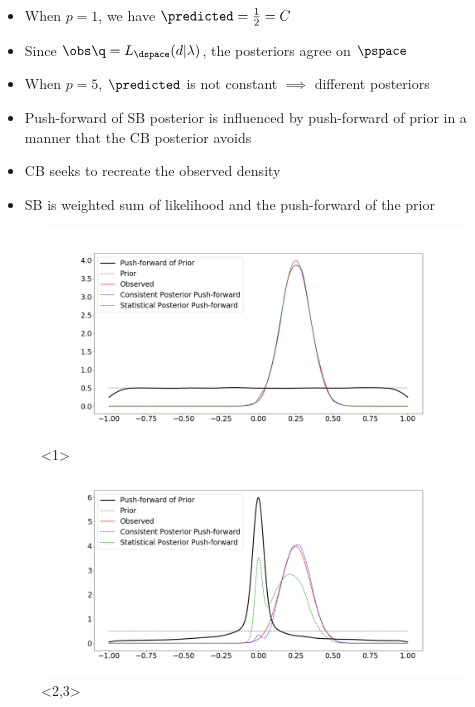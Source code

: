 
\begin{frame}[t]

\begin{itemize}
	\item <1,3> When $p=1$, we have $\predicted = \frac{1}{2} = C$
	\item <1> Since $\obs\q = L_\dspace(d|\lambda)$, the posteriors agree on $\pspace$
	\item <2,3> When $p=5$, $\predicted$ is not constant $\implies$ different posteriors
	\item <2> Push-forward of SB posterior is influenced by push-forward of prior in a manner that the CB posterior avoids
	\item <3> CB seeks to recreate the observed density
	\item <3> SB is weighted sum of likelihood and the push-forward of the prior
\end{itemize}

\begin{figure}\label{fig:comparison}
		\includegraphics[width=.8\linewidth]{../images/comparison1.png}<1>
		\includegraphics[width=.8\linewidth]{../images/comparison5.png}<2,3>
\end{figure}

\end{frame}

